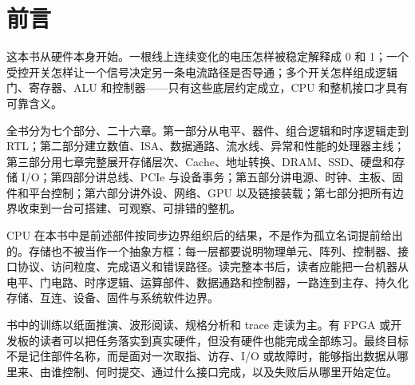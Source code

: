 \chapter*{前言}

这本书从硬件本身开始。一根线上连续变化的电压怎样被稳定解释成 0 和 1；一个受控开关怎样让一个信号决定另一条电流路径是否导通；多个开关怎样组成逻辑门、寄存器、ALU 和控制器——只有这些底层约定成立，CPU 和整机接口才具有可靠含义。

全书分为七个部分、二十六章。第一部分从电平、器件、组合逻辑和时序逻辑走到 RTL；第二部分建立数值、ISA、数据通路、流水线、异常和性能的处理器主线；第三部分用七章完整展开存储层次、Cache、地址转换、DRAM、SSD、硬盘和存储 I/O；第四部分讲总线、PCIe 与设备事务；第五部分讲电源、时钟、主板、固件和平台控制；第六部分讲外设、网络、GPU 以及链接装载；第七部分把所有边界收束到一台可搭建、可观察、可排错的整机。

CPU 在本书中是前述部件按同步边界组织后的结果，不是作为孤立名词提前给出的。存储也不被当作一个抽象方框：每一层都要说明物理单元、阵列、控制器、接口协议、访问粒度、完成语义和错误路径。读完整本书后，读者应能把一台机器从电平、门电路、时序逻辑、运算部件、数据通路和控制器，一路连到主存、持久化存储、互连、设备、固件与系统软件边界。

书中的训练以纸面推演、波形阅读、规格分析和 trace 走读为主。有 FPGA 或开发板的读者可以把任务落实到真实硬件，但没有硬件也能完成全部练习。最终目标不是记住部件名称，而是面对一次取指、访存、I/O 或故障时，能够指出数据从哪里来、由谁控制、何时提交、通过什么接口完成，以及失败后从哪里开始定位。
